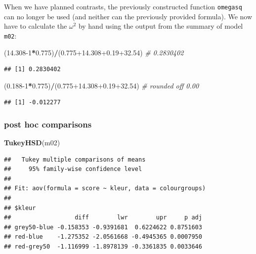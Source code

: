 \documentclass[
]{book}
\newenvironment{Shaded}{\begin{snugshade}}{\end{snugshade}}
\newcommand{\CommentTok}[1]{\textcolor[rgb]{0.56,0.35,0.01}{\textit{#1}}}
\newcommand{\DecValTok}[1]{\textcolor[rgb]{0.00,0.00,0.81}{#1}}
\newcommand{\FloatTok}[1]{\textcolor[rgb]{0.00,0.00,0.81}{#1}}
\newcommand{\KeywordTok}[1]{\textcolor[rgb]{0.13,0.29,0.53}{\textbf{#1}}}
\newcommand{\NormalTok}[1]{#1}
\newcommand{\OperatorTok}[1]{\textcolor[rgb]{0.81,0.36,0.00}{\textbf{#1}}}
\begin{document}
When we have planned contrasts, the previously constructed function \texttt{omegasq} can no longer be used (and neither can the previously provided formula). We now have to calculate the \(\omega^2\) by hand using the output from the summary of model \texttt{m02}:

\begin{Shaded}
\begin{Highlighting}[]
\NormalTok{(}\FloatTok{14.308}\DecValTok{{-}1}\OperatorTok{*}\FloatTok{0.775}\NormalTok{)}\OperatorTok{/}\NormalTok{(}\FloatTok{0.775+14.308+0.19+32.54}\NormalTok{) }\CommentTok{\# 0.2830402}
\end{Highlighting}
\end{Shaded}

\begin{verbatim}
## [1] 0.2830402
\end{verbatim}

\begin{Shaded}
\begin{Highlighting}[]
\NormalTok{(}\FloatTok{0.188}\DecValTok{{-}1}\OperatorTok{*}\FloatTok{0.775}\NormalTok{)}\OperatorTok{/}\NormalTok{(}\FloatTok{0.775+14.308+0.19+32.54}\NormalTok{) }\CommentTok{\# rounded off 0.00}
\end{Highlighting}
\end{Shaded}

\begin{verbatim}
## [1] -0.012277
\end{verbatim}

\hypertarget{r-post-hoc-comparisons}{%
\subsubsection{post hoc comparisons}\label{r-post-hoc-comparisons}}

\begin{Shaded}
\begin{Highlighting}[]
\KeywordTok{TukeyHSD}\NormalTok{(m02)}
\end{Highlighting}
\end{Shaded}

\begin{verbatim}
##   Tukey multiple comparisons of means
##     95% family-wise confidence level
## 
## Fit: aov(formula = score ~ kleur, data = colourgroups)
## 
## $kleur
##                  diff        lwr        upr     p adj
## grey50-blue -0.158353 -0.9391681  0.6224622 0.8751603
## red-blue    -1.275352 -2.0561668 -0.4945365 0.0007950
## red-grey50  -1.116999 -1.8978139 -0.3361835 0.0033646
\end{verbatim}
\end{document}
